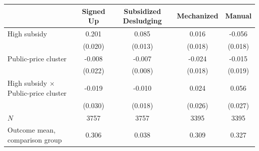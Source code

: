 \begin{tabular}{lcccc}
\hline\hline
 & Signed Up & Subsidized Desludging & Mechanized & Manual \\
\hline
High subsidy & 0.201 & 0.085 & 0.016 & -0.056 \\
 & (0.020) & (0.013) & (0.018) & (0.018) \\
Public-price cluster & -0.008 & -0.007 & -0.024 & -0.015 \\
 & (0.022) & (0.008) & (0.018) & (0.019) \\
High subsidy $\times$ Public-price cluster & -0.019 & -0.010 & 0.024 & 0.056 \\
 & (0.030) & (0.018) & (0.026) & (0.027) \\
\hline
$N$ & 3757 & 3757 & 3395 & 3395 \\
Outcome mean, comparison group & 0.306 & 0.038 & 0.309 & 0.327 \\
\hline\hline
\end{tabular}
